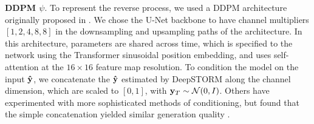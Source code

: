 \textbf{DDPM $\psi$}. To represent the reverse process, we used a DDPM architecture originally proposed in \parencite{Saharia2021}. We chose the U-Net backbone to have channel multipliers $[1,2,4,8,8]$ in the downsampling and upsampling paths of the architecture. In this architecture, parameters are shared across time, which is specified to the network using the Transformer sinusoidal position embedding, and uses self-attention at the $16 \times 16$ feature map resolution. To condition the model on the input $\bold{\hat{y}}$, we concatenate the $\bold{\hat{y}}$ estimated by DeepSTORM along the channel dimension, which are scaled to $[0,1]$, with $\bold{y}_T\sim \mathcal{N}(0, I)$. Others have experimented with more sophisticated methods of conditioning, but found that the simple concatenation yielded similar generation quality \parencite{Saharia2021}. 


